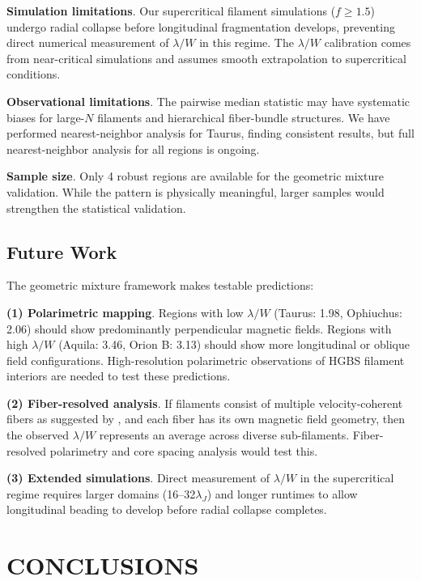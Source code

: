 \documentclass[twoside,twocolumn]{mnras}
\begin{document}
\textbf{Simulation limitations}. Our supercritical filament simulations ($f \geq 1.5$) undergo radial collapse before longitudinal fragmentation develops, preventing direct numerical measurement of $\lambda/W$ in this regime. The $\lambda/W$ calibration comes from near-critical simulations and assumes smooth extrapolation to supercritical conditions.

\textbf{Observational limitations}. The pairwise median statistic may have systematic biases for large-$N$ filaments and hierarchical fiber-bundle structures. We have performed nearest-neighbor analysis for Taurus, finding consistent results, but full nearest-neighbor analysis for all regions is ongoing.

\textbf{Sample size}. Only 4 robust regions are available for the geometric mixture validation. While the pattern is physically meaningful, larger samples would strengthen the statistical validation.

\subsection{Future Work}

The geometric mixture framework makes testable predictions:

\textbf{(1) Polarimetric mapping}. Regions with low $\lambda/W$ (Taurus: 1.98, Ophiuchus: 2.06) should show predominantly perpendicular magnetic fields. Regions with high $\lambda/W$ (Aquila: 3.46, Orion B: 3.13) should show more longitudinal or oblique field configurations. High-resolution polarimetric observations of HGBS filament interiors are needed to test these predictions.

\textbf{(2) Fiber-resolved analysis}. If filaments consist of multiple velocity-coherent fibers as suggested by \citet{Hacar2013}, and each fiber has its own magnetic field geometry, then the observed $\lambda/W$ represents an average across diverse sub-filaments. Fiber-resolved polarimetry and core spacing analysis would test this.

\textbf{(3) Extended simulations}. Direct measurement of $\lambda/W$ in the supercritical regime requires larger domains (16--32$\lambda_J$) and longer runtimes to allow longitudinal beading to develop before radial collapse completes.

\section{CONCLUSIONS}
\end{document}
